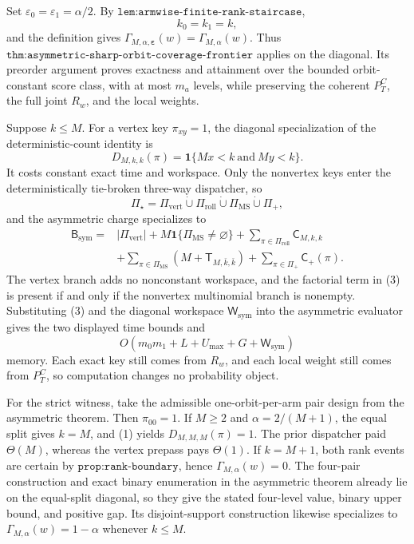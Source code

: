 Set \(\varepsilon_0=\varepsilon_1=\alpha/2\). By \(\texttt{lem:armwise-finite-rank-staircase}\),
\[
k_0=k_1=k,
\]
and the definition gives \(\Gamma_{M,\alpha,\boldsymbol\varepsilon}(w)=\Gamma_{M,\alpha}(w)\). Thus \(\texttt{thm:asymmetric-sharp-orbit-coverage-frontier}\) applies on the diagonal. Its preorder argument proves exactness and attainment over the bounded orbit-constant score class, with at most \(m_a\) levels, while preserving the coherent \(P_T^C\), the full joint \(R_w\), and the local weights.

Suppose \(k\le M\). For a vertex key \(\pi_{xy}=1\), the diagonal specialization of the deterministic-count identity is
\[
D_{M,k,k}(\pi)=\mathbf 1\{Mx<k\ \text{and}\ My<k\}.
\tag{1}
\]
It costs constant exact time and workspace. Only the nonvertex keys enter the deterministically tie-broken three-way dispatcher, so
\[
\Pi_\star=\Pi_{\mathrm{vert}}\mathbin{\dot\cup}\Pi_{\mathrm{roll}}\mathbin{\dot\cup}\Pi_{\mathrm{MS}}\mathbin{\dot\cup}\Pi_+,
\tag{2}
\]
and the asymmetric charge specializes to
\[
\begin{aligned}
\mathsf B_{\mathrm{sym}}={}&|\Pi_{\mathrm{vert}}|+M\mathbf 1\{\Pi_{\mathrm{MS}}\ne\varnothing\}
+\sum_{\pi\in\Pi_{\mathrm{roll}}}\mathsf C_{M,k,k}\\
&+\sum_{\pi\in\Pi_{\mathrm{MS}}}(M+\mathsf T_{M,\bar k,\bar k})
+\sum_{\pi\in\Pi_+}\mathsf C_+(\pi).
\end{aligned}
\tag{3}
\]
The vertex branch adds no nonconstant workspace, and the factorial term in (3) is present if and only if the nonvertex multinomial branch is nonempty. Substituting (3) and the diagonal workspace \(\mathsf W_{\mathrm{sym}}\) into the asymmetric evaluator gives the two displayed time bounds and
\[
O(m_0m_1+L+U_{\max}+G+\mathsf W_{\mathrm{sym}})
\]
memory. Each exact key still comes from \(R_w\), and each local weight still comes from \(P_T^C\), so computation changes no probability object.

For the strict witness, take the admissible one-orbit-per-arm pair design from the asymmetric theorem. Then \(\pi_{00}=1\). If \(M\ge2\) and \(\alpha=2/(M+1)\), the equal split gives \(k=M\), and (1) yields \(D_{M,M,M}(\pi)=1\). The prior dispatcher paid \(\Theta(M)\), whereas the vertex prepass pays \(\Theta(1)\). If \(k=M+1\), both rank events are certain by \(\texttt{prop:rank-boundary}\), hence \(\Gamma_{M,\alpha}(w)=0\). The four-pair construction and exact binary enumeration in the asymmetric theorem already lie on the equal-split diagonal, so they give the stated four-level value, binary upper bound, and positive gap. Its disjoint-support construction likewise specializes to \(\Gamma_{M,\alpha}(w)=1-\alpha\) whenever \(k\le M\).